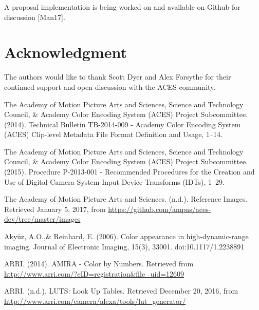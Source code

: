 \documentclass[conference]{IEEEtran}
\begin{document}
A proposal implementation is being worked on and available on Github for discussion [Man17].

\section*{Acknowledgment}
The authors would like to thank Scott Dyer and Alex Forsythe for their continued support and open discussion with the ACES community.

\begin{thebibliography}{1}
	\makeatletter
	\renewcommand\
	\makeatother

\renewcommand\@biblabel[1]{[Amp14]}
\bibitem{}
\vspace*{\fill}
The Academy of Motion Picture Arts and Sciences, Science and Technology Council, \& Academy Color Encoding System (ACES) Project Subcommittee. (2014). Technical Bulletin TB-2014-009 - Academy Color Encoding System (ACES) Clip-level Metadata File Format Definition and Usage, 1–14. \vspace{2mm}

\renewcommand\@biblabel[1]{[Amp15]}
\bibitem{}
The Academy of Motion Picture Arts and Sciences, Science and Technology Council, \& Academy Color Encoding System (ACES) Project Subcommittee. (2015). Procedure P-2013-001 - Recommended Procedures for the Creation and Use of Digital Camera System Input Device Transforms (IDTs), 1–29. \vspace{2mm}

\renewcommand\@biblabel[1]{[Amp17]}
\bibitem{}
The Academy of Motion Picture Arts and Sciences. (n.d.). Reference Images. Retrieved January 5, 2017, from \url{https://github.com/ampas/aces-dev/tree/master/images} \vspace{2mm}

\renewcommand\@biblabel[1]{[AR06]}
\bibitem{}
Akyüz, A.O.,\& Reinhard, E. (2006). Color appearance in high-dynamic-range imaging. Journal of Electronic Imaging, 15(3), 33001. doi:10.1117/1.2238891 \vspace{2mm}

\renewcommand\@biblabel[1]{[Arr14]}
\bibitem{}
ARRI. (2014). AMIRA - Color by Numbers. Retrieved from \url{http://www.arri.com/?eID=registration&file_uid=12609} \vspace{2mm}

\renewcommand\@biblabel[1]{[Arr16]}
\bibitem{}
ARRI. (n.d.). LUTS: Look Up Tables. Retrieved December 20, 2016, from \url{http://www.arri.com/camera/alexa/tools/lut_generator/} \vspace{2mm}


\end{thebibliography}
\end{document}
